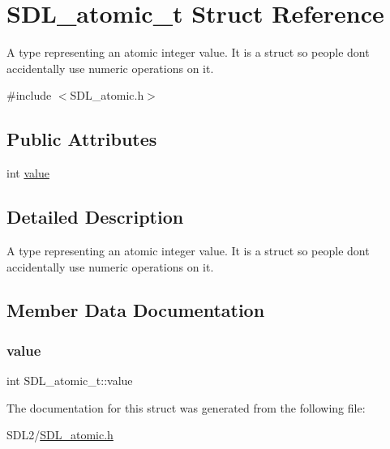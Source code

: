 \hypertarget{struct_s_d_l__atomic__t}{}\section{S\+D\+L\+\_\+atomic\+\_\+t Struct Reference}
\label{struct_s_d_l__atomic__t}


A type representing an atomic integer value. It is a struct so people don\textquotesingle{}t accidentally use numeric operations on it.  




{\ttfamily \#include $<$S\+D\+L\+\_\+atomic.\+h$>$}

\subsection*{Public Attributes}
\begin{DoxyCompactItemize}
\item 
int \hyperlink{struct_s_d_l__atomic__t_a0d09ddf3cc5798c709edb7cea104203a}{value}
\end{DoxyCompactItemize}


\subsection{Detailed Description}
A type representing an atomic integer value. It is a struct so people don\textquotesingle{}t accidentally use numeric operations on it. 

\subsection{Member Data Documentation}
\mbox{\label{struct_s_d_l__atomic__t_a0d09ddf3cc5798c709edb7cea104203a}} 
\subsubsection{\texorpdfstring{value}{value}}
{\footnotesize\ttfamily int S\+D\+L\+\_\+atomic\+\_\+t\+::value}



The documentation for this struct was generated from the following file\+:\begin{DoxyCompactItemize}
\item 
S\+D\+L2/\hyperlink{_s_d_l__atomic_8h}{S\+D\+L\+\_\+atomic.\+h}\end{DoxyCompactItemize}
